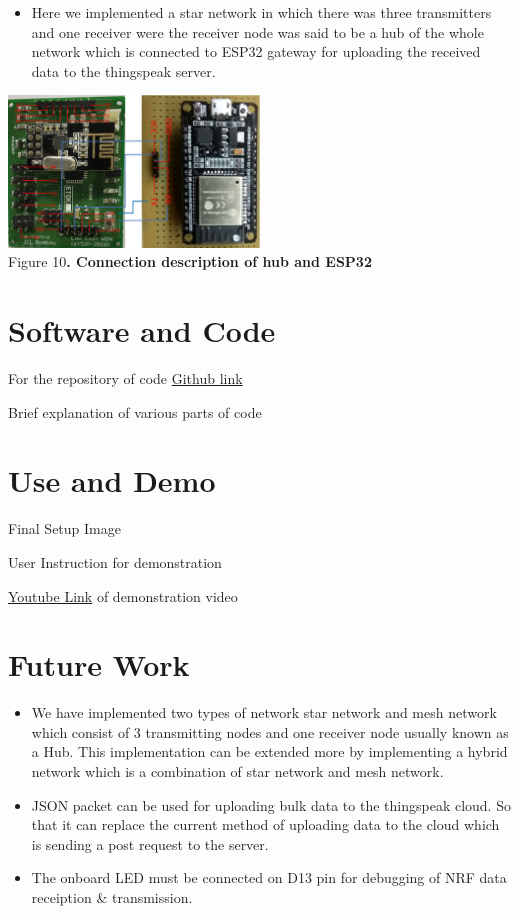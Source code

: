 \documentclass[a4paper,12pt,oneside]{book}
\begin{document}
\begin{itemize}
\item Here we implemented a star network in which there was three transmitters and one receiver were the receiver node was said to be a hub of the whole network which is connected to ESP32 gateway for uploading the received data to the thingspeak server.

\end{itemize}
\begin{center}
\includegraphics[width=0.5\textwidth]{gateway.PNG}\\
         \small{Figure 10\textbf{. Connection description of hub and ESP32}}\\
\end{center}




\section{Software and Code}
For the repository of code \href{https://github.com/eYSIP-2018/Low_Cost_Sensor_Node} {Github link}

Brief explanation of various parts of code 

\section{Use and Demo}
Final Setup Image

User Instruction for demonstration

\href{https://github.com/eYSIP-2018/Low_Cost_Sensor_Node}{Youtube Link} of demonstration video 

\section{Future Work}
\begin{itemize}
\item We have implemented two types of network star network and mesh network which consist of 3 transmitting nodes and one receiver node usually known as a Hub. This implementation can be extended more by implementing a hybrid network which is a combination of star network and mesh network.
\item  JSON packet can be used for uploading bulk data to the thingspeak cloud. So that it can replace the current method of uploading data to the cloud which is sending a post request to the server. 
\item The onboard LED must be connected on D13 pin for debugging of NRF data receiption \& transmission.
\end{itemize}
\end{document}
